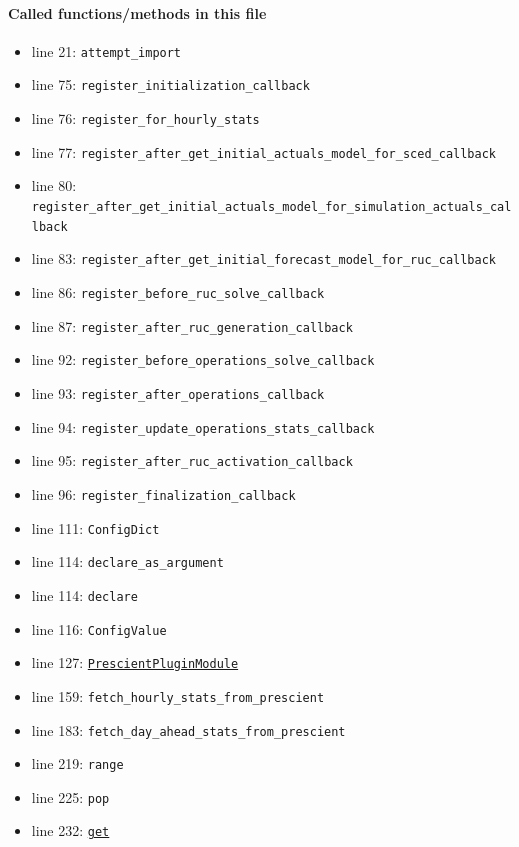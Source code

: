 \documentclass[11pt]{report}
\begin{document}
\paragraph{Called functions/methods in this file}
\begin{itemize}[leftmargin=*]
  \item line 21: \texttt{attempt\_import}
  \item line 75: \texttt{register\_initialization\_callback}
  \item line 76: \texttt{register\_for\_hourly\_stats}
  \item line 77: \texttt{register\_after\_get\_initial\_actuals\_model\_for\_sced\_callback}
  \item line 80: \texttt{register\_after\_get\_initial\_actuals\_model\_for\_simulation\_actuals\_callback}
  \item line 83: \texttt{register\_after\_get\_initial\_forecast\_model\_for\_ruc\_callback}
  \item line 86: \texttt{register\_before\_ruc\_solve\_callback}
  \item line 87: \texttt{register\_after\_ruc\_generation\_callback}
  \item line 92: \texttt{register\_before\_operations\_solve\_callback}
  \item line 93: \texttt{register\_after\_operations\_callback}
  \item line 94: \texttt{register\_update\_operations\_stats\_callback}
  \item line 95: \texttt{register\_after\_ruc\_activation\_callback}
  \item line 96: \texttt{register\_finalization\_callback}
  \item line 111: \texttt{ConfigDict}
  \item line 114: \texttt{declare\_as\_argument}
  \item line 114: \texttt{declare}
  \item line 116: \texttt{ConfigValue}
  \item line 127: \hyperref[def:coordinator.py:PrescientPluginModule:L24]{\texttt{PrescientPluginModule}}
  \item line 159: \texttt{fetch\_hourly\_stats\_from\_prescient}
  \item line 183: \texttt{fetch\_day\_ahead\_stats\_from\_prescient}
  \item line 219: \texttt{range}
  \item line 225: \texttt{pop}
  \item line 232: \hyperref[def:tests-test_backcaster.py:DAPrices.get:L294]{\texttt{get}}

\end{itemize}
\end{document}
